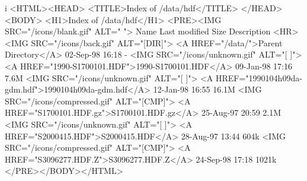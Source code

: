 

\begin{vcode}{i}
<HTML><HEAD>
<TITLE>Index of /data/hdf</TITLE>
</HEAD><BODY>
<H1>Index of /data/hdf</H1>
<PRE><IMG SRC="/icons/blank.gif" ALT="     "> Name                   Last modified     Size  Description
<HR>
<IMG SRC="/icons/back.gif" ALT="[DIR]"> <A HREF="/data/">Parent Directory</A>       02-Sep-98 16:18      -  
<IMG SRC="/icons/unknown.gif" ALT="[   ]"> <A HREF="1990-S1700101.HDF">1990-S1700101.HDF</A>      09-Jan-98 17:16   7.6M  
<IMG SRC="/icons/unknown.gif" ALT="[   ]"> <A HREF="1990104h09da-gdm.hdf">1990104h09da-gdm.hdf</A>   12-Jan-98 16:55  16.1M  
<IMG SRC="/icons/compressed.gif" ALT="[CMP]"> <A HREF="S1700101.HDF.gz">S1700101.HDF.gz</A>        25-Aug-97 20:59   2.1M  
<IMG SRC="/icons/unknown.gif" ALT="[   ]"> <A HREF="S2000415.HDF">S2000415.HDF</A>           28-Aug-97 13:44   604k  
<IMG SRC="/icons/compressed.gif" ALT="[CMP]"> <A HREF="S3096277.HDF.Z">S3096277.HDF.Z</A>         24-Sep-98 17:18  1021k  
</PRE></BODY></HTML>
\end{vcode}
